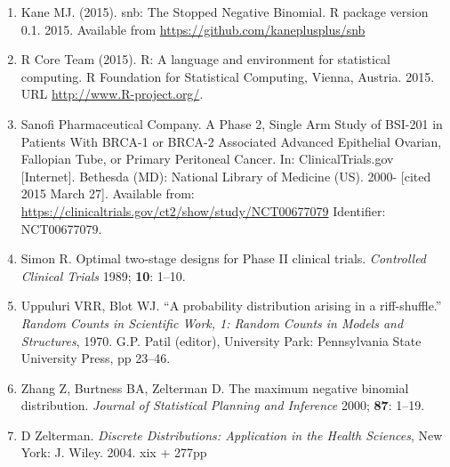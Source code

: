 \documentclass[12pt]{article}         %
\begin{document}
\begin{enumerate}

\item[\bibref{Kane 2015}]
Kane MJ. (2015). snb: The Stopped Negative Binomial. R package version 0.1. 2015. Available from \url{https://github.com/kaneplusplus/snb}

\item[\bibref{R Core Team 2015}]
R Core Team (2015). R: A language and environment for statistical
computing. R Foundation for Statistical Computing, Vienna, Austria. 2015. URL \url{http://www.R-project.org/}.

\item[\bibref{Sanofi 2013}]
Sanofi Pharmaceutical Company. A Phase 2, Single Arm Study of BSI-201 in Patients With BRCA-1 or BRCA-2 Associated Advanced Epithelial Ovarian, Fallopian Tube, or Primary Peritoneal Cancer. In: ClinicalTrials.gov [Internet]. Bethesda (MD): National Library of Medicine (US). 2000- [cited 2015 March 27]. Available from: \url{https://clinicaltrials.gov/ct2/show/study/NCT00677079} Identifier: NCT00677079.

\item[\bibref{Simon 1989}]
Simon R.  Optimal two-stage designs for Phase II clinical trials. {\it Controlled Clinical Trials\/} 1989; {\bf 10}: 1--10.

\item[\bibref{Uppuluri 1970}] 
Uppuluri VRR, Blot WJ. ``A probability distribution arising in a riff-shuffle.'' {\it Random Counts  in Scientific Work, 1: Random Counts in Models and Structures}, 1970. G.P. Patil (editor), University Park: Pennsylvania State University Press, pp  23--46.

\item[\bibref{Zhang 2000}]
Zhang Z, Burtness BA, Zelterman D.  The maximum negative binomial distribution. {\em Journal of Statistical Planning and Inference\/}  2000; {\bf 87}: 1--19.

\item[\bibref{Zelterman 2004}]
D Zelterman. {\it Discrete Distributions: Application in 
the Health Sciences}, New York: J. Wiley. 2004. xix + 277pp

\end{enumerate}





\end{document}
